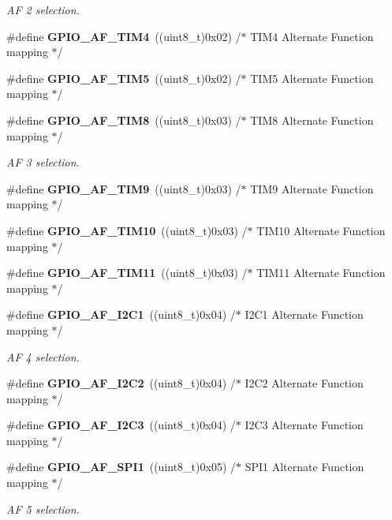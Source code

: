 \begin{DoxyCompactItemize}
\begin{DoxyCompactList}\small\item\em AF 2 selection. \end{DoxyCompactList}\item 
\#define \textbf{ G\+P\+I\+O\+\_\+\+A\+F\+\_\+\+T\+I\+M4}~((uint8\+\_\+t)0x02)  /$\ast$ T\+I\+M4 Alternate Function mapping $\ast$/
\item 
\#define \textbf{ G\+P\+I\+O\+\_\+\+A\+F\+\_\+\+T\+I\+M5}~((uint8\+\_\+t)0x02)  /$\ast$ T\+I\+M5 Alternate Function mapping $\ast$/
\item 
\#define \textbf{ G\+P\+I\+O\+\_\+\+A\+F\+\_\+\+T\+I\+M8}~((uint8\+\_\+t)0x03)  /$\ast$ T\+I\+M8 Alternate Function mapping $\ast$/
\begin{DoxyCompactList}\small\item\em AF 3 selection. \end{DoxyCompactList}\item 
\#define \textbf{ G\+P\+I\+O\+\_\+\+A\+F\+\_\+\+T\+I\+M9}~((uint8\+\_\+t)0x03)  /$\ast$ T\+I\+M9 Alternate Function mapping $\ast$/
\item 
\#define \textbf{ G\+P\+I\+O\+\_\+\+A\+F\+\_\+\+T\+I\+M10}~((uint8\+\_\+t)0x03)  /$\ast$ T\+I\+M10 Alternate Function mapping $\ast$/
\item 
\#define \textbf{ G\+P\+I\+O\+\_\+\+A\+F\+\_\+\+T\+I\+M11}~((uint8\+\_\+t)0x03)  /$\ast$ T\+I\+M11 Alternate Function mapping $\ast$/
\item 
\#define \textbf{ G\+P\+I\+O\+\_\+\+A\+F\+\_\+\+I2\+C1}~((uint8\+\_\+t)0x04)  /$\ast$ I2\+C1 Alternate Function mapping $\ast$/
\begin{DoxyCompactList}\small\item\em AF 4 selection. \end{DoxyCompactList}\item 
\#define \textbf{ G\+P\+I\+O\+\_\+\+A\+F\+\_\+\+I2\+C2}~((uint8\+\_\+t)0x04)  /$\ast$ I2\+C2 Alternate Function mapping $\ast$/
\item 
\#define \textbf{ G\+P\+I\+O\+\_\+\+A\+F\+\_\+\+I2\+C3}~((uint8\+\_\+t)0x04)  /$\ast$ I2\+C3 Alternate Function mapping $\ast$/
\item 
\#define \textbf{ G\+P\+I\+O\+\_\+\+A\+F\+\_\+\+S\+P\+I1}~((uint8\+\_\+t)0x05)  /$\ast$ S\+P\+I1 Alternate Function mapping $\ast$/
\begin{DoxyCompactList}\small\item\em AF 5 selection. \end{DoxyCompactList}\item 

\end{DoxyCompactItemize}
